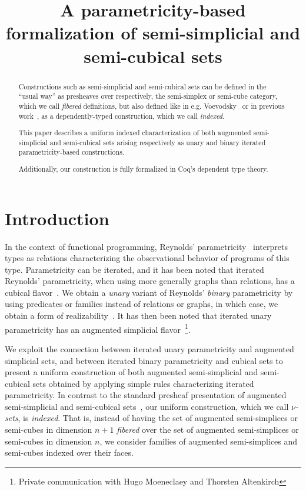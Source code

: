 \documentclass[10pt]{art.cls/art}
\title{A parametricity-based formalization of semi-simplicial and semi-cubical sets}
\author{\IEEEauthorblockN{Hugo Herbelin \\ and Ramkumar Ramachandra} \IEEEauthorblockA{Université Paris Cité, Inria, CNRS, IRIF, Paris}}
\begin{document}
\maketitle
\begin{abstract}
  Constructions such as semi-simplicial and semi-cubical sets can be defined in the ``usual way'' as presheaves over respectively, the semi-simplex or semi-cube category, which we call \emph{fibered} definitions, but also defined like in e.g. Voevodsky~\cite{voevodsky12} or in previous work~\cite{herbelin15}, as a dependently-typed construction, which we call \emph{indexed}. %

  This paper describes a uniform indexed characterization of both augmented semi-simplicial and semi-cubical sets arising respectively as unary and binary iterated parametricity-based constructions.

  Additionally, our construction is fully formalized in Coq's dependent type theory.
\end{abstract}

\section{Introduction}
In the context of functional programming, Reynolds' parametricity~\cite{reynolds72} interprets types as relations characterizing the observational behavior of programs of this type. Parametricity can be iterated, and it has been noted that iterated Reynolds' parametricity, when using more generally graphs than relations, has a cubical flavor~\cite{johann17,altenkirch15,moulin16,moeneclaey21,moeneclaey22phd}. We obtain a \emph{unary} variant of Reynolds' \emph{binary} parametricity by using predicates or families instead of relations or graphs, in which case, we obtain a form of realizability~\cite{bernardy12,lasson12,moulin16}. It has then been noted that iterated unary parametricity has an augmented simplicial flavor~\footnote{Private communication with Hugo Moeneclaey and Thorsten Altenkirch}. %

We exploit the connection between iterated unary parametricity and augmented simplicial sets, and between iterated binary parametricity and cubical sets to present a uniform construction of both augmented semi-simplicial and semi-cubical sets obtained by applying simple rules characterizing iterated parametricity. In contrast to the standard presheaf presentation of augmented semi-simplicial and semi-cubical sets~\cite{fri08,grandis03,buchholtz17}, our uniform construction, which we call \emph{$\nu$-sets}, is \emph{indexed}. That is, instead of having the set of augmented semi-simplices or semi-cubes in dimension $n+1$ \emph{fibered} over the set of augmented semi-simplices or semi-cubes in dimension $n$, we consider families of augmented semi-simplices and semi-cubes indexed over their faces.
\end{document}
